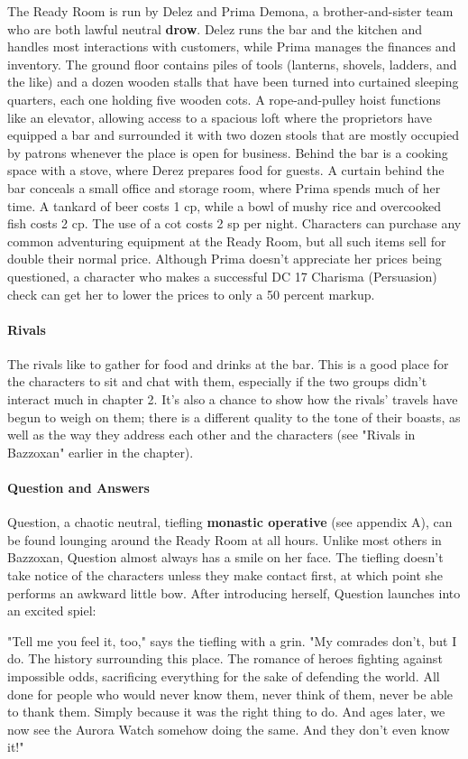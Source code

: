 \documentclass[10pt,a4,twoside,twocolumn,openany,nodeprecatedcode]{dndbook}
\begin{document}
The Ready Room is run by Delez and Prima Demona, a brother-and-sister team who are both lawful neutral \textbf{drow}. Delez runs the bar and the kitchen and handles most interactions with customers, while Prima manages the finances and inventory.
The ground floor contains piles of tools (lanterns, shovels, ladders, and the like) and a dozen wooden stalls that have been turned into curtained sleeping quarters, each one holding five wooden cots. A rope-and-pulley hoist functions like an elevator, allowing access to a spacious loft where the proprietors have equipped a bar and surrounded it with two dozen stools that are mostly occupied by patrons whenever the place is open for business. Behind the bar is a cooking space with a stove, where Derez prepares food for guests. A curtain behind the bar conceals a small office and storage room, where Prima spends much of her time.
A tankard of beer costs 1 cp, while a bowl of mushy rice and overcooked fish costs 2 cp. The use of a cot costs 2 sp per night. Characters can purchase any common adventuring equipment at the Ready Room, but all such items sell for double their normal price. Although Prima doesn't appreciate her prices being questioned, a character who makes a successful DC 17 Charisma (Persuasion) check can get her to lower the prices to only a 50 percent markup.
\paragraph{Rivals}
The rivals like to gather for food and drinks at the bar. This is a good place for the characters to sit and chat with them, especially if the two groups didn't interact much in chapter 2. It's also a chance to show how the rivals' travels have begun to weigh on them; there is a different quality to the tone of their boasts, as well as the way they address each other and the characters (see "Rivals in Bazzoxan" earlier in the chapter).
\paragraph{Question and Answers}
Question, a chaotic neutral, tiefling \textbf{monastic operative} (see appendix A), can be found lounging around the Ready Room at all hours. Unlike most others in Bazzoxan, Question almost always has a smile on her face.
The tiefling doesn't take notice of the characters unless they make contact first, at which point she performs an awkward little bow. After introducing herself, Question launches into an excited spiel:
\begin{DndReadAloud}{}
"Tell me you feel it, too," says the tiefling with a grin. "My comrades don't, but I do. The history surrounding this place. The romance of heroes fighting against impossible odds, sacrificing everything for the sake of defending the world. All done for people who would never know them, never think of them, never be able to thank them. Simply because it was the right thing to do. And ages later, we now see the Aurora Watch somehow doing the same. And they don't even know it!"
\end{DndReadAloud}
\end{document}
